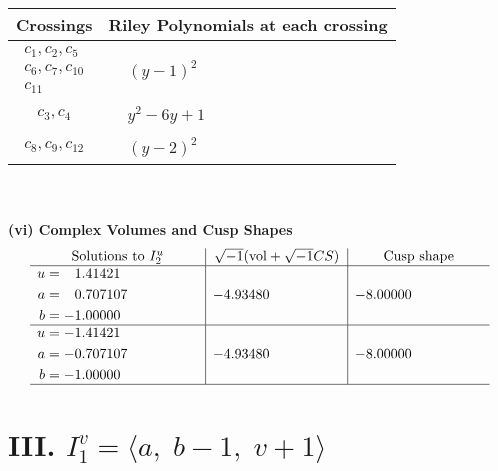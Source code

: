 \documentclass[1p]{elsarticle_modified}
\theoremstyle{definition}
\newcommand{\I}{\sqrt{-1}}
\begin{document}
\begin{tabular}{m{50pt}|m{274pt}}
Crossings & \hspace{64pt}Riley Polynomials at each crossing \\
\hline $$\begin{aligned}c_{1},c_{2},c_{5}\\c_{6},c_{7},c_{10}\\c_{11}\end{aligned}$$&$\begin{aligned}
&(y-1)^2
\end{aligned}$\\
\hline $$\begin{aligned}c_{3},c_{4}\end{aligned}$$&$\begin{aligned}
&y^2-6 y+1
\end{aligned}$\\
\hline $$\begin{aligned}c_{8},c_{9},c_{12}\end{aligned}$$&$\begin{aligned}
&(y-2)^2
\end{aligned}$\\
\hline
\end{tabular}\\~\\
\newpage\flushleft \textbf{(vi) Complex Volumes and Cusp Shapes}
$$\begin{array}{c|c|c}  
\text{Solutions to }I^u_{2}& \I (\text{vol} + \sqrt{-1}CS) & \text{Cusp shape}\\
 \hline 
\begin{aligned}
u &= \phantom{-}1.41421\phantom{ +0.000000I} \\
a &= \phantom{-}0.707107\phantom{ +0.000000I} \\
b &= -1.00000\phantom{ +0.000000I}\end{aligned}
 & -4.93480\phantom{ +0.000000I} & -8.00000\phantom{ +0.000000I} \\ \hline\begin{aligned}
u &= -1.41421\phantom{ +0.000000I} \\
a &= -0.707107\phantom{ +0.000000I} \\
b &= -1.00000\phantom{ +0.000000I}\end{aligned}
 & -4.93480\phantom{ +0.000000I} & -8.00000\phantom{ +0.000000I}\\
 \hline 
 \end{array}$$\newpage\newpage\renewcommand{\arraystretch}{1}
\centering \section*{III. $I^v_{1}= \langle a,\;b-1,\;v+1 \rangle$}
\end{document}
